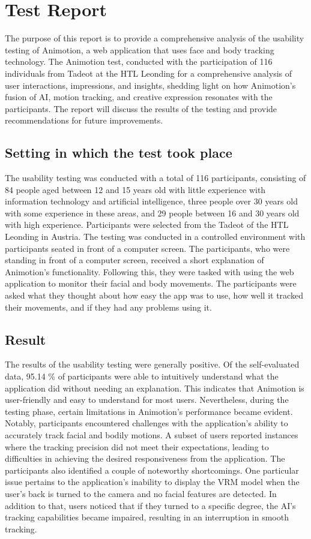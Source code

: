 \section{Test Report}
The purpose of this report is to provide a comprehensive analysis of the usability testing of Animotion, a web application that uses face and 
body tracking technology. The Animotion test, conducted with the participation of 116 individuals from Tadeot at the 
HTL Leonding for a comprehensive analysis of user interactions, impressions, and insights, shedding light on how Animotion's 
fusion of AI, motion tracking, and creative expression resonates with the participants. 
The report will discuss the results of the testing and provide recommendations for future improvements.

\subsection{Setting in which the test took place}
The usability testing was conducted with a total of 116 participants, consisting of 84 people aged between 12 and 15 years old with little experience 
with information technology and artificial intelligence, three people over 30 years old with some experience in these areas, and 29 people 
between 16 and 30 years old with high experience. Participants were selected from the Tadeot of the HTL Leonding in Austria. 
The testing was conducted in a controlled environment with participants seated in front of a computer screen.
The participants, who were standing in front of a computer screen, received a short explanation of Animotion's functionality. 
Following this, they were tasked with using the web application to monitor their facial and body movements. 
The participants were asked what they thought about how easy the app was to use, how well it tracked their movements, and if they had any problems using it.

\subsection{Result}
The results of the usability testing were generally positive. Of the self-evaluated data, 95.14 \% of participants were able to intuitively 
understand what the application did without needing an explanation. This indicates that Animotion is user-friendly and easy to understand for most users.
Nevertheless, during the testing phase, certain limitations in Animotion's performance became evident. Notably, participants encountered challenges with the 
application's ability to accurately track facial and bodily motions. A subset of users reported instances where the tracking precision did not meet their 
expectations, leading to difficulties in achieving the desired responsiveness from the application.
The participants also identified a couple of noteworthy shortcomings. One particular issue pertains to the application's inability to 
display the VRM model when the user's back is turned to the camera and no facial features are detected. In addition to that, users noticed that if they 
turned to a specific degree, the AI's tracking capabilities became impaired, resulting in an interruption in smooth tracking.

